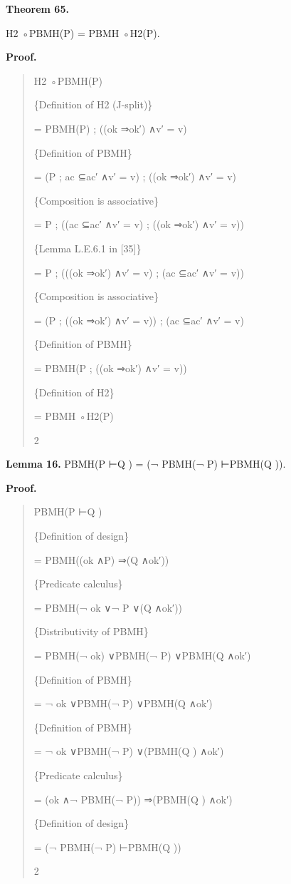 \documentclass[11pt]{article}
\begin{document}
\noindent\textbf{Theorem 65.}


H2 ◦PBMH(P) = PBMH ◦H2(P).

\noindent\textbf{Proof.}


\begin{quote}\small\raggedright
H2 ◦PBMH(P)
\par
\{Definition of H2 (J-split)\}
\par
= PBMH(P) ; ((ok ⇒ok′) ∧v′ = v)
\par
\{Definition of PBMH\}
\par
= (P ; ac ⊆ac′ ∧v′ = v) ; ((ok ⇒ok′) ∧v′ = v)
\par
\{Composition is associative\}
\par
= P ; ((ac ⊆ac′ ∧v′ = v) ; ((ok ⇒ok′) ∧v′ = v))
\par
\{Lemma L.E.6.1 in [35]\}
\par
= P ; (((ok ⇒ok′) ∧v′ = v) ; (ac ⊆ac′ ∧v′ = v))
\par
\{Composition is associative\}
\par
= (P ; ((ok ⇒ok′) ∧v′ = v)) ; (ac ⊆ac′ ∧v′ = v)
\par
\{Definition of PBMH\}
\par
= PBMH(P ; ((ok ⇒ok′) ∧v′ = v))
\par
\{Definition of H2\}
\par
= PBMH ◦H2(P)
\par
2
\end{quote}

\noindent\textbf{Lemma 16.} PBMH(P ⊢Q ) = (¬ PBMH(¬ P) ⊢PBMH(Q )).


\noindent\textbf{Proof.}


\begin{quote}\small\raggedright
PBMH(P ⊢Q )
\par
\{Definition of design\}
\par
= PBMH((ok ∧P) ⇒(Q ∧ok′))
\par
\{Predicate calculus\}
\par
= PBMH(¬ ok ∨¬ P ∨(Q ∧ok′))
\par
\{Distributivity of PBMH\}
\par
= PBMH(¬ ok) ∨PBMH(¬ P) ∨PBMH(Q ∧ok′)
\par
\{Definition of PBMH\}
\par
= ¬ ok ∨PBMH(¬ P) ∨PBMH(Q ∧ok′)
\par
\{Definition of PBMH\}
\par
= ¬ ok ∨PBMH(¬ P) ∨(PBMH(Q ) ∧ok′)
\par
\{Predicate calculus\}
\par
= (ok ∧¬ PBMH(¬ P)) ⇒(PBMH(Q ) ∧ok′)
\par
\{Definition of design\}
\par
= (¬ PBMH(¬ P) ⊢PBMH(Q ))
\par
2
\end{quote}
\end{document}
